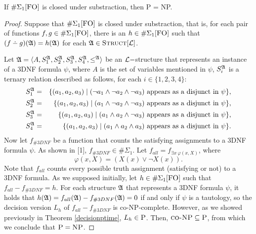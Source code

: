 \begin{theo}
	If $\E1$ is closed under substraction, then {\sc P} = {\sc NP}.
\end{theo}
\begin{proof}
	Suppose that $\E1$ is closed under substraction, that is, for each pair of functions $f,g\in \E1$, there is an $h\in\E1$ such that $(f\dotminus g)(\A) = h(\A)$ for each ${\frak A}\in\textsc{Struct}[{\cal L}]$.
	
	Let ${\frak A} = \langle A, S_1^{\frak A}, S_2^{\frak A}, S_3^{\frak A}, S_4^{\frak A}, \leq^{\frak A} \rangle$ be an ${\cal L}-$structure that represents an instance of a 3DNF formula $\psi$, where $A$ is the set of variables mentioned in $\psi$, $S_i^{\frak A}$ is a ternary relation described as follows, for each $i\in\{1,2,3,4\}$:
	\begin{eqnarray*}
		S_1^{\frak A} &=& \{(a_1,a_2,a_3)\mid (\neg a_1 \wedge \neg a_2 \wedge \neg a_3) \mbox{ appears as a disjunct in }\psi\},\\
		S_2^{\frak A} &=& \{(a_1,a_2,a_3)\mid ( a_1 \wedge \neg a_2 \wedge \neg a_3) \mbox{ appears as a disjunct in }\psi\},\\
		S_3^{\frak A} &=& \{(a_1,a_2,a_3)\mid ( a_1 \wedge  a_2 \wedge \neg a_3) \mbox{ appears as a disjunct in }\psi\},\\
		S_4^{\frak A} &=& \{(a_1,a_2,a_3)\mid ( a_1 \wedge  a_2 \wedge  a_3) \mbox{ appears as a disjunct in }\psi\}.
	\end{eqnarray*}
	Now let $f_{\#3DNF}$ be a function that counts the satisfying assignments to a 3DNF formula $\psi$. As shown in [1], $f_{\#3DNF} \in \#\Sigma_1$. Let $f_{all} = f_{\exists x\:\varphi(x,X)}$, where
	$$
	\varphi(x,X) = (X(x) \vee \neg X(x)).
	$$
	Note that $f_{all}$ counts every possible truth assignment (satisfying or not) to a 3DNF formula. As we supposed initially, let $h\in\E1$ such that $f_{all}-f_{\#3DNF} = h$. For each structure ${\frak A}$ that represents a 3DNF formula $\psi$, it holds that $h({\frak A}) = f_{all}({\frak A})-f_{\#3DNF}({\frak A}) = 0$ if and only if $\psi$ is a tautology, so the decision version $L_h$ of $f_{all}-f_{\#3DNF}$ is {\sc co-NP}-complete. However, as we showed previously in Theorem \ref{decisionptime}, $L_h \in \textsc{P}$. Then, $\textsc{co-NP} \subseteq \textsc{P}$, from which we conclude that $\textsc{P} = \textsc{NP}$.
\end{proof}

